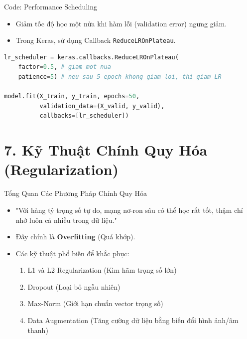 \documentclass[aspectratio=169]{beamer}
\begin{document}
\begin{frame}[fragile]{Code: Performance Scheduling}
    \begin{itemize}
        \item Giảm tốc độ học một nửa khi hàm lỗi (validation error) ngưng giảm.
        \item Trong Keras, sử dụng Callback \texttt{ReduceLROnPlateau}.
    \end{itemize}
\begin{lstlisting}[language=Python]
lr_scheduler = keras.callbacks.ReduceLROnPlateau(
    factor=0.5, # giam mot nua
    patience=5) # neu sau 5 epoch khong giam loi, thi giam LR

model.fit(X_train, y_train, epochs=50,
          validation_data=(X_valid, y_valid),
          callbacks=[lr_scheduler])
\end{lstlisting}
\end{frame}

\section{7. Kỹ Thuật Chính Quy Hóa (Regularization)}

\begin{frame}{Tổng Quan Các Phương Pháp Chính Quy Hóa}
    \begin{itemize}
        \item "Với hàng tỷ trọng số tự do, mạng nơ-ron sâu có thể học rất tốt, thậm chí nhớ luôn cả nhiễu trong dữ liệu."
        \item Đây chính là \textbf{Overfitting} (Quá khớp).
        \item Các kỹ thuật phổ biến để khắc phục:
        \begin{enumerate}
            \item L1 và L2 Regularization (Kìm hãm trọng số lớn)
            \item Dropout (Loại bỏ ngẫu nhiên)
            \item Max-Norm (Giới hạn chuẩn vector trọng số)
            \item Data Augmentation (Tăng cường dữ liệu bằng biến đổi hình ảnh/âm thanh)
        \end{enumerate}
    \end{itemize}
\end{frame}
\end{document}
